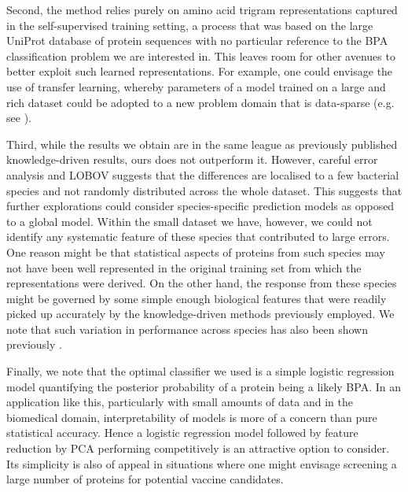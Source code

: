 \documentclass[10pt,journal,compsoc,twoside]{IEEEtran}
\begin{document}
Second, the method relies purely on amino acid trigram representations captured in the self-supervised training setting, a process that was based on the large UniProt database of protein sequences \cite{uniprot_2018} with no particular reference to the BPA classification problem we are interested in. This leaves room for other avenues to better exploit such learned representations. For example, one could envisage the use of transfer learning, whereby parameters of a model trained on a large and rich dataset could be adopted to a new problem domain that is data-sparse (e.g. see  \cite{du_transfer-learning}). 

Third, while the results we obtain are in the same league as previously published knowledge-driven results, ours does not outperform it. However, careful error analysis and LOBOV suggests that the differences are localised to a few bacterial species and not randomly distributed across the whole dataset. This suggests that further explorations could consider species-specific prediction models as opposed to a global model. Within the small dataset we have, however, we could not identify any systematic feature of these species that contributed to large errors. One reason might be that statistical aspects of proteins from such species may not have been well represented in the original training set from which the representations were derived. On the other hand, the response from these species might be governed by some simple enough biological features that were readily picked up accurately by the knowledge-driven methods previously employed. We note that such variation in performance across species has also been shown previously \cite{heinson_2019}.

Finally, we note that the optimal classifier we used is a simple logistic regression model quantifying the posterior probability of a protein being a likely BPA. In an application like this, particularly with small amounts of data and in the biomedical domain, interpretability of models is more of a concern than pure statistical accuracy. Hence a logistic regression model followed by feature reduction by PCA performing competitively is an attractive option to consider. Its simplicity is also of appeal in situations where one might envisage screening a large number of proteins for potential vaccine candidates.    
\end{document}
